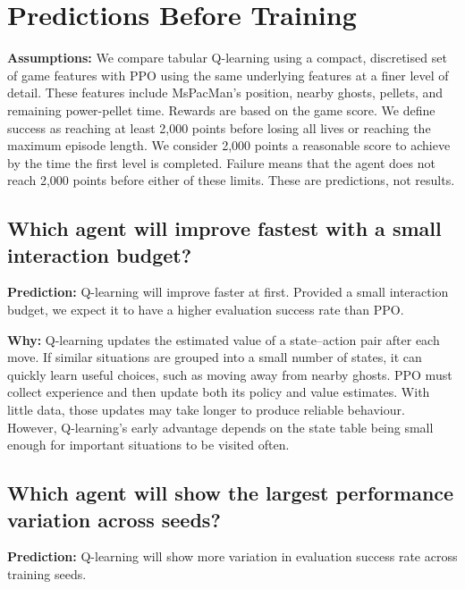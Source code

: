 \section{Predictions Before Training}



\textbf{Assumptions:} We compare tabular Q-learning using a compact, discretised set of game features with PPO using the same underlying features at a finer level of detail. These features include MsPacMan's position, nearby ghosts, pellets, and remaining power-pellet time. Rewards are based on the game score. We define success as reaching at least 2,000 points before losing all lives or reaching the maximum episode length. We consider 2,000 points a reasonable score to achieve by the time the first level is completed. Failure means that the agent does not reach 2,000 points before either of these limits. These are predictions, not results.


\subsection{Which agent will improve fastest with a small interaction budget?}
\textbf{Prediction:} Q-learning will improve faster at first. Provided a small interaction budget, we expect it to have a higher evaluation success rate than PPO.

\textbf{Why:} Q-learning updates the estimated value of a state--action pair after each move. If similar situations are grouped into a small number of states, it can quickly learn useful choices, such as moving away from nearby ghosts. PPO must collect experience and then update both its policy and value estimates. With little data, those updates may take longer to produce reliable behaviour. However, Q-learning's early advantage depends on the state table being small enough for important situations to be visited often.

\subsection{Which agent will show the largest performance variation across seeds?}
\textbf{Prediction:} Q-learning will show more variation in evaluation success rate across training seeds.

